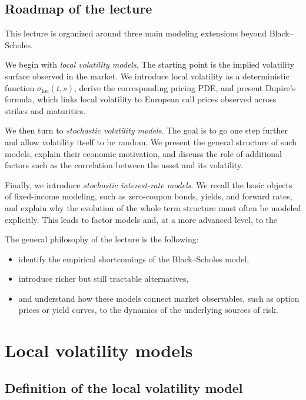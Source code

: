\documentclass[11pt]{article}
\theoremstyle{plain}
\theoremstyle{definition}
\theoremstyle{remark}
\begin{document}
\subsection{Roadmap of the lecture}

This lecture is organized around three main modeling extensions beyond
Black--Scholes.

We begin with \emph{local volatility models}.
The starting point is the implied volatility surface observed in the
market.
We introduce local volatility as a deterministic function
\(\sigma_{\mathrm{loc}}(t,s)\), derive the corresponding pricing PDE,
and present Dupire's formula, which links local volatility to European
call prices observed across strikes and maturities.  

We then turn to \emph{stochastic volatility models}.
The goal is to go one step further and allow volatility itself to be
random.
We present the general structure of such models, explain their economic
motivation, and discuss the role of additional factors such as the
correlation between the asset and its volatility.

Finally, we introduce \emph{stochastic interest-rate models}.
We recall the basic objects of fixed-income modeling, such as
zero-coupon bonds, yields, and forward rates, and explain why the
evolution of the whole term structure must often be modeled explicitly.
This leads to factor models and, at a more advanced level, to the


The general philosophy of the lecture is the following:
\begin{itemize}[leftmargin=1.4em]
    \item identify the empirical shortcomings of the Black--Scholes model,
    \item introduce richer but still tractable alternatives,
    \item and understand how these models connect market observables,
    such as option prices or yield curves, to the dynamics of the
    underlying sources of risk.
\end{itemize}

\section{Local volatility models}

\subsection{Definition of the local volatility model}
\end{document}
